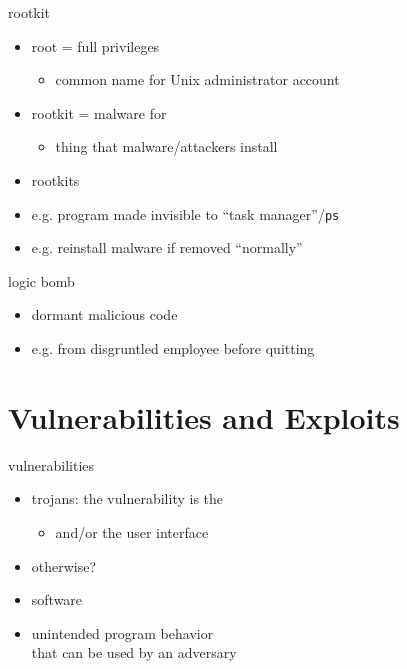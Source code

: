 \begin{frame}{rootkit}
    \begin{itemize}
    \item root = full privileges 
        \begin{itemize}
        \item common name for Unix administrator account
        \end{itemize}
    \item rootkit = malware for 
        \begin{itemize}
        \item thing that malware/attackers install
        \end{itemize}
    \item rootkits 
    \item e.g. program made invisible to ``task manager''/{\tt ps}
    \item e.g. reinstall malware if removed ``normally''
    \end{itemize}
\end{frame}

\begin{frame}{logic bomb}
    \begin{itemize}
    \item dormant malicious code
    \item e.g. from disgruntled employee before quitting
    \end{itemize}
\end{frame}

\section{Vulnerabilities and Exploits}

\begin{frame}{vulnerabilities}
    \begin{itemize}
    \item trojans: the vulnerability is the 
        \begin{itemize}
        \item and/or the user interface
        \end{itemize}
    \item otherwise?
    \item software 
    \vspace{.5cm}
    \item unintended program behavior \\ that can be used by an adversary
    \end{itemize}
\end{frame}

